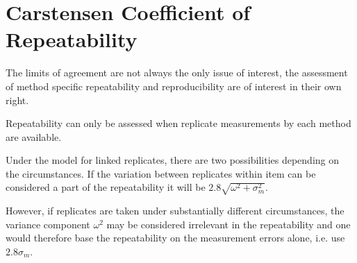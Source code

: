 \documentclass[12pt, a4paper]{report}
\theoremstyle{plain}
\theoremstyle{definition}
\theoremstyle{remark}
\begin{document}
	\section{Carstensen Coefficient of Repeatability}
	The limits of agreement are not always the only issue of
	interest, the assessment of method specific repeatability and
	reproducibility are of interest in their own right.
	
	Repeatability can only be assessed when replicate
	measurements by each method are available.
	
	Under the model for linked replicates, there are two
	possibilities depending on the circumstances.
	If the variation between replicates within item can be
	considered a part of the repeatability it will be $2.8 \sqrt{
		\omega^2 + \sigma^2_m}$.
	
	However, if replicates are taken under substantially
	different circumstances, the variance component $\omega^2$ may be considered irrelevant in the repeatability and one would therefore
	base the repeatability on the measurement errors alone, i.e. use $2.8 \sigma_m$.
	




\end{document}
